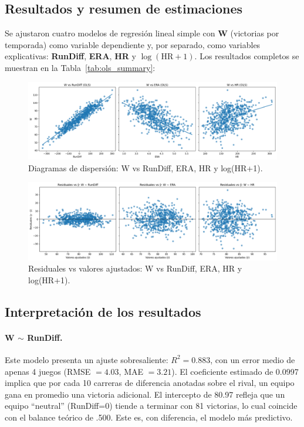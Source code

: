 \documentclass[man,floatsintext]{apa7}
\begin{document}
\subsection{Resultados y resumen de estimaciones}

Se ajustaron cuatro modelos de regresión lineal simple con \textbf{W} (victorias por temporada) 
como variable dependiente y, por separado, como variables explicativas: \textbf{RunDiff}, \textbf{ERA}, \textbf{HR} y \textbf{\(\log(\text{HR}+1)\)}. 
Los resultados completos se muestran en la Tabla~\ref{tab:ols_summary}:



\begin{figure}[H]
    \centering
    \includegraphics[width=\textwidth]{../plots/ols_scatter_grid_RunDiff_ERA_HR.png}
    \caption{Diagramas de dispersión: W vs RunDiff, ERA, HR y log(HR+1).}
\end{figure}

\begin{figure}[H]
    \centering
    \includegraphics[width=\textwidth]{../plots/ols_resid_grid_RunDiff_ERA_HR.png}
    \caption{Residuales vs valores ajustados: W vs RunDiff, ERA, HR y log(HR+1).}
\end{figure}

\subsection{Interpretación de los resultados}

\paragraph{W \(\sim\) RunDiff.}  
Este modelo presenta un ajuste sobresaliente: \(R^2=0.883\), con un error medio de apenas 4 juegos (RMSE \(=4.03\), MAE \(=3.21\)). El coeficiente estimado de 0.0997 implica que por cada 10 carreras de diferencia anotadas sobre el rival, un equipo gana en promedio una victoria adicional. El intercepto de 80.97 refleja que un equipo “neutral” (RunDiff=0) tiende a terminar con 81 victorias, lo cual coincide con el balance teórico de .500. Este es, con diferencia, el modelo más predictivo.
\end{document}
